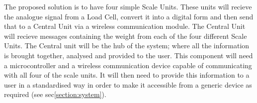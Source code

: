 The proposed solution is to have four simple Scale Units. These units will recieve the analogue signal from a Load Cell, convert it into a digital form and then send that to a Central Unit via a wireless communication module. The Central Unit will recieve messages containing the weight from each of the four different Scale Units. The Central unit will be the hub of the system; where all the information is brought together, analysed and provided to the user. This component will need a microcontroller and a wireless communication device capable of communicating with all four of the scale units. It will then need to provide this information to a user in a standardised way in order to make it accessible from a generic device as required (see sec\ref{section:system}).
